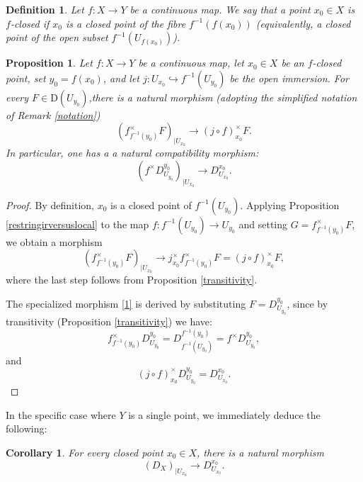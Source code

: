 \documentclass[amssymb,amscd,11pt,20pt]{amsart}
\newcommand{\RR}{\mathbb R}
\newcommand{\0}{\mathbf 0}
\theoremstyle{plain}
\newtheorem{cor}[thm]{Corollary}
\newtheorem{prop}[thm]{Proposition}
\newtheorem{defn}[thm]{Definition}
\numberwithin{equation}{thm}
\begin{document}
\begin{defn}{\rm Let $f\colon X\to Y$ be a continuous map. We say that a point  $x_0\in X$ is {\em $f$-closed} if $x_0$ is a closed point of the fibre $f^{-1}(f(x_0))$ (equivalently, a closed point of the open subset $f^{-1}(U_{f(x_0)})$). %
}
\end{defn}

\begin{prop}\label{f-localdual} Let $f\colon X\to Y$ be a continuous map, let  $x_0\in X$ be an $f$-closed point, set $y_0=f(x_0)$, and let $j\colon U_{x_0}\hookrightarrow f^{-1}(U_{y_0})$ be the open immersion. For every $F\in \mathrm{D}(U_{y_0})$,there is a natural morphism (adopting the simplified notation of Remark \ref{notation})
\begin{equation}\label{0} (f^\times_{f^{-1}(y_0)} F)_{\vert U_{x_0}} %
\to (j\circ f)^\times_{x_0} F.
\end{equation}
In particular, one has a a natural compatibility morphism:
\begin{equation}\label{1}   ( f^\times D_{U_{y_0}}^{y_0})_{\vert U_{x_0}}\to    D_{U_{x_0}}^{x_0}.\end{equation}
\end{prop}

\begin{proof} By definition, $x_0$ is a closed point of $f^{-1}(U_{y_0})$. Applying Proposition \ref{restringirversuslocal}   to the map $f\colon  f^{-1}(U_{y_0}) \to U_{y_0}$ and setting $G=f^\times_{f^{-1}(y_0)} F$, we obtain a morphism
\[ (f^\times_{f^{-1}(y_0)} F)_{\vert U_{x_0}} \longrightarrow j^\times_{x_0} f^\times_{f^{-1}(y_0)} F = (j\circ f)^\times_{x_0}F, \]
where the last step follows from Proposition \ref{transitivity}.

The specialized morphism \eqref{1} is derived by substituting $F = D_{U_{y_0}}^{y_0}$, since by transitivity \textup{(Proposition \ref{transitivity})} we have:
\[ f^\times_{f^{-1}(y_0)}D_{U_{y_0}}^{y_0} = D_{f^{-1}(U_{y_0})}^{f^{-1}(y_0)} = f^\times D_{U_{y_0}}^{y_0}, \] 
and 
\[ (j\circ f)^\times_{x_0} D_{U_{y_0}}^{y_0} = D_{U_{x_0}}^{x_0}. \]
\end{proof}

In the specific case where $Y$ is a single point, we immediately deduce the following:

\begin{cor}\label{localglobalcompatibility}  For every closed point  $x_0\in X$, there is a natural morphism
$$ (D_X)_{\vert U_{x_0}}\to D_{U_{x_0}}^{x_0}.$$ 

 
\end{cor}
\end{document}
